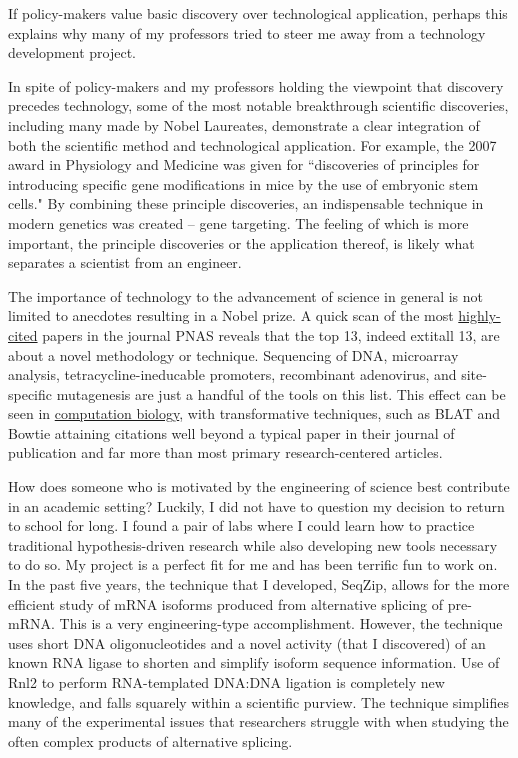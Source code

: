 {{    If policy-makers value basic discovery over technological application, perhaps this explains why many of my professors tried to steer me away from a technology development project.

    In spite of policy-makers and my professors holding the viewpoint that discovery precedes technology, some of the most notable breakthrough scientific discoveries, including many made by Nobel Laureates, demonstrate a clear integration of both the scientific method and technological application.  For example, the 2007 award in Physiology and Medicine was given for “discoveries of principles for introducing specific gene modifications in mice by the use of embryonic stem cells."  By combining these principle discoveries, an indispensable technique in modern genetics was created – gene targeting.  The feeling of which is more important, the principle discoveries or the application thereof, is likely what separates a scientist from an engineer. 

    The importance of technology to the advancement of science in general is not limited to anecdotes resulting in a Nobel prize. A quick scan of the most \href{http://www.pnas.org/reports/most-cited}{highly-cited} papers in the journal PNAS reveals that the top 13, indeed   extit{all} 13, are about a novel methodology or technique. Sequencing of DNA, microarray analysis, tetracycline-ineducable promoters, recombinant adenovirus, and site-specific mutagenesis are just a handful of the tools on this list. This effect can be seen in \href{http://simplystatistics.org/2014/04/07/writing-good-software-can-have-more-impact-than-publishing-in-high-impact-journals-for-genomic-statisticians/}{computation biology}, with transformative techniques, such as BLAT \citep{Altschul1990} and Bowtie \citep{Langmead2009} attaining citations well beyond a typical paper in their journal of publication and far more than most primary research-centered articles.

    How does someone who is motivated by the engineering of science best contribute in an academic setting? Luckily, I did not have to question my decision to return to school for long. I found a pair of labs where I could learn how to practice traditional hypothesis-driven research while also developing new tools necessary to do so. My project is a perfect fit for me and has been terrific fun to work on. In the past five years, the technique that I developed, SeqZip, allows for the more efficient study of  mRNA isoforms produced from alternative splicing of pre-mRNA. This is a very engineering-type accomplishment. However, the technique uses short DNA oligonucleotides and a novel activity (that I discovered) of an known RNA ligase to shorten and simplify isoform sequence information. Use of Rnl2 to perform RNA-templated DNA:DNA ligation is completely new knowledge, and falls squarely within a scientific purview. The technique simplifies many of the experimental issues that researchers struggle with when studying the often complex products of alternative splicing.
    
}}
